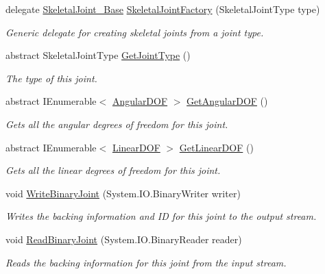 \begin{DoxyCompactItemize}
\item 
delegate \hyperlink{class_skeletal_joint___base}{Skeletal\+Joint\+\_\+\+Base} \hyperlink{class_skeletal_joint___base_aac5116bb70fb19058943811a19951848}{Skeletal\+Joint\+Factory} (Skeletal\+Joint\+Type type)
\begin{DoxyCompactList}\small\item\em Generic delegate for creating skeletal joints from a joint type. \end{DoxyCompactList}\item 
abstract Skeletal\+Joint\+Type \hyperlink{class_skeletal_joint___base_aee155cbd483cb512bf3fc0f9a8885335}{Get\+Joint\+Type} ()
\begin{DoxyCompactList}\small\item\em The type of this joint. \end{DoxyCompactList}\item 
abstract I\+Enumerable$<$ \hyperlink{interface_angular_d_o_f}{Angular\+D\+OF} $>$ \hyperlink{class_skeletal_joint___base_abf96267052733ccf001e0b092c6582f8}{Get\+Angular\+D\+OF} ()
\begin{DoxyCompactList}\small\item\em Gets all the angular degrees of freedom for this joint. \end{DoxyCompactList}\item 
abstract I\+Enumerable$<$ \hyperlink{interface_linear_d_o_f}{Linear\+D\+OF} $>$ \hyperlink{class_skeletal_joint___base_a14564d8c44dfeef8b7a10044f2392cde}{Get\+Linear\+D\+OF} ()
\begin{DoxyCompactList}\small\item\em Gets all the linear degrees of freedom for this joint. \end{DoxyCompactList}\item 
void \hyperlink{class_skeletal_joint___base_a42df720cdd871ccad5930ae7977f7200}{Write\+Binary\+Joint} (System.\+I\+O.\+Binary\+Writer writer)
\begin{DoxyCompactList}\small\item\em Writes the backing information and ID for this joint to the output stream. \end{DoxyCompactList}\item 
void \hyperlink{class_skeletal_joint___base_a7f71e5afc3b791ffed1bd040425737ef}{Read\+Binary\+Joint} (System.\+I\+O.\+Binary\+Reader reader)
\begin{DoxyCompactList}\small\item\em Reads the backing information for this joint from the input stream. \end{DoxyCompactList}\item 

\end{DoxyCompactItemize}

